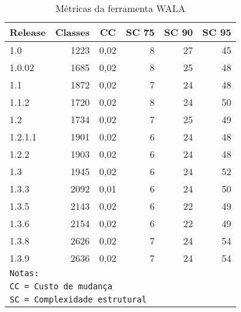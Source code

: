 \begin{table}[H]
\caption{Métricas da ferramenta WALA}
  \centering
\begin{tabular}{|l|r|r|r|r|r|}
\hline
\multicolumn{1}{|c|}{\textbf{Release}} & \multicolumn{1}{c|}{\textbf{Classes}} & \multicolumn{1}{c|}{\textbf{CC}} & \multicolumn{1}{c|}{\textbf{SC 75}} & \multicolumn{1}{c|}{\textbf{SC 90}} & \multicolumn{1}{c|}{\textbf{SC 95}} \\ \hline
1.0 & 1223 & 0,02 & 8 & 27 & 45 \\ \hline
1.0.02 & 1685 & 0,02 & 8 & 25 & 48 \\ \hline
1.1 & 1872 & 0,02 & 7 & 24 & 48 \\ \hline
1.1.2 & 1720 & 0,02 & 8 & 24 & 50 \\ \hline
1.2 & 1734 & 0,02 & 7 & 25 & 49 \\ \hline
1.2.1.1 & 1901 & 0,02 & 6 & 24 & 48 \\ \hline
1.2.2 & 1903 & 0,02 & 6 & 24 & 48 \\ \hline
1.3 & 1945 & 0,02 & 6 & 24 & 52 \\ \hline
1.3.3 & 2092 & 0,01 & 6 & 24 & 50 \\ \hline
1.3.5 & 2143 & 0,02 & 6 & 22 & 49 \\ \hline
1.3.6 & 2154 & 0,02 & 6 & 22 & 49 \\ \hline
1.3.8 & 2626 & 0,02 & 7 & 24 & 54 \\ \hline
1.3.9 & 2636 & 0,02 & 7 & 24 & 54 \\ \hline
\multicolumn{6}{l}{\texttt{Notas:}} \\
\multicolumn{6}{l}{\texttt{CC = Custo de mudança}} \\
\multicolumn{6}{l}{\texttt{SC = Complexidade estrutural}} \\ \hline
\end{tabular}
\label{metricas-wala}
\end{table}

